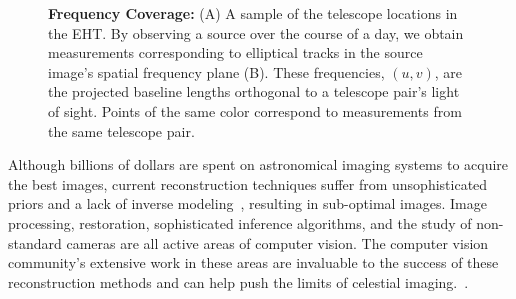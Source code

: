 \begin{figure}[t!]
	\centering
	\caption{ \footnotesize{{\bf Frequency Coverage:} (A) A sample of the telescope locations in the EHT. By observing a source over the course of a day, we obtain measurements corresponding to elliptical tracks in the source image's spatial frequency plane (B). These frequencies, $(u,v)$, are the projected baseline lengths orthogonal to a telescope pair's light of sight. Points of the same color correspond to measurements from the same telescope pair.}}
	\label{fig:uvcov}
	\vspace{-0.23in}
\end{figure}


Although billions of dollars are spent on astronomical imaging systems to acquire the best images, current reconstruction techniques suffer from unsophisticated priors and a lack of inverse modeling~\cite{renard2011image}, resulting in sub-optimal images. Image processing, restoration, sophisticated inference algorithms, and the study of non-standard cameras are all active areas of computer vision. The computer vision community's extensive work in these areas are invaluable to the success of these reconstruction methods and can help push the limits of celestial imaging.~\cite{freeman2002example, glasner2009super, levin2011efficient, zoran2011learning}. 




